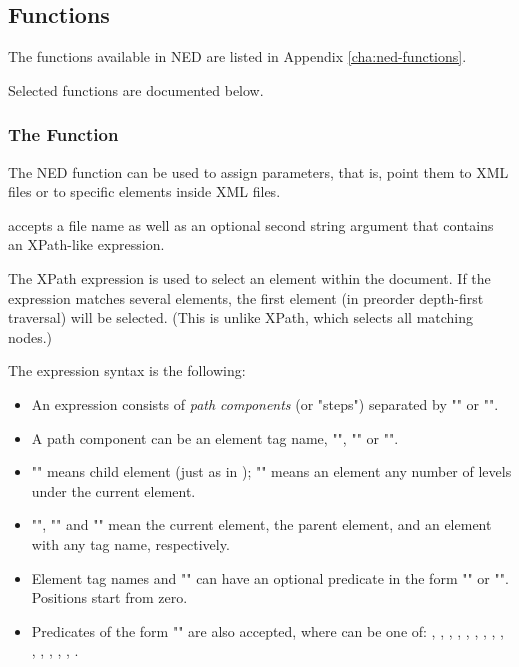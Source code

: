 {\subsection{Functions}
\label{sec:ned-ref:functions}

The functions available in NED are listed in Appendix
\ref{cha:ned-functions}.

Selected functions are documented below.

\subsubsection{The  Function}
\label{sec:ned-ref:xmldoc-function}

The  NED function can be used to assign  parameters,
that is, point them to XML files or to specific elements inside XML files.

 accepts a file name as well as an optional second string argument
that contains an XPath-like expression.


The XPath expression is used to select an element within the document.
If the expression matches several elements, the first element
(in preorder depth-first traversal) will be selected. (This is
unlike XPath, which selects all matching nodes.)

The expression syntax is the following:
\begin{itemize}
  \item An expression consists of \textit{path components} (or "steps")
        separated by "\ttt{/}" or "\ttt{//}".
  \item A path component can be an element tag name, "\ttt{*}", ""
        or "".
  \item "\ttt{/}" means child element (just as in );
        "\ttt{//}" means an element any number of levels under the current element.
  \item "", "" and "\ttt{*}" mean the current element,
        the parent element, and an element with any tag name, respectively.
  \item Element tag names and "\ttt{*}" can have an optional predicate
        in the form "\ttt{[position]}" or "\ttt{[@attribute='value']}".
        Positions start from zero.
  \item Predicates of the form "\ttt{[@attribute=\textit{\$param}]}" are also
        accepted, where  can be one of:
        ,
        ,
        ,
        ,
        ,
        ,
        ,
        ,
        ,
        ,
        ,
        ,
        ,
        ,
        .
\end{itemize}

}
